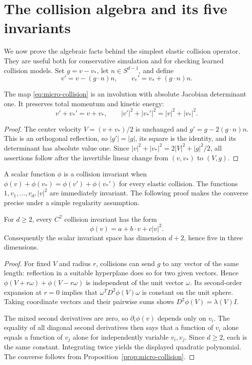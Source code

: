 \section{The collision algebra and its five invariants}

We now prove the algebraic facts behind the simplest elastic collision
operator.  They are useful both for conservative simulation and for
checking learned collision models.  Set $g=v-v_*$, let
$n\in S^{d-1}$, and define
\begin{equation}
 v'=v-(g\cdot n)n,\qquad
 v_*'=v_*+(g\cdot n)n.
 \label{eq:micro-collision}
\end{equation}

\begin{proposition}
\label{prop:micro-collision}
The map \eqref{eq:micro-collision} is an involution with absolute
Jacobian determinant one.  It preserves total momentum and kinetic
energy:
\[
 v'+v_*'=v+v_*,\qquad
 |v'|^2+|v_*'|^2=|v|^2+|v_*|^2.
\]
\end{proposition}
\begin{proof}
The center velocity $V=(v+v_*)/2$ is unchanged and
$g'=g-2(g\cdot n)n$.  This is an orthogonal reflection, so
$|g'|=|g|$, its square is the identity, and its determinant has
absolute value one.  Since
$|v|^2+|v_*|^2=2|V|^2+|g|^2/2$, all assertions follow after the
invertible linear change from $(v,v_*)$ to $(V,g)$.
\end{proof}

A scalar function $\phi$ is a collision invariant when
$\phi(v)+\phi(v_*)=\phi(v')+\phi(v_*')$ for every elastic
collision.  The functions $1,v_1,\ldots,v_d,|v|^2$ are immediately
invariant.  The following proof makes the converse precise under a
simple regularity assumption.

\begin{proposition}
\label{prop:micro-invariants}
For $d\ge2$, every $C^2$ collision invariant has the form
\[
 \phi(v)=a+b\cdot v+c|v|^2.
\]
Consequently the scalar invariant space has dimension $d+2$, hence
five in three dimensions.
\end{proposition}
\begin{proof}
For fixed $V$ and radius $r$, collisions can send $g$ to any vector
of the same length: reflection in a suitable hyperplane does so for
two given vectors.  Hence
$\phi(V+r\omega)+\phi(V-r\omega)$ is independent of the unit
vector $\omega$.  Its second-order expansion at $r=0$ implies
that $\omega^TD^2\phi(V)\omega$ is constant on the unit sphere.
Taking coordinate vectors and their pairwise sums shows
$D^2\phi(V)=\lambda(V)I$.

The mixed second derivatives are zero, so $\partial_i\phi(v)$
depends only on $v_i$.  The equality of all diagonal second
derivatives then says that a function of $v_i$ alone equals a function
of $v_j$ alone for independently variable $v_i,v_j$.  Since $d\ge2$,
each is the same constant.  Integrating twice yields the displayed
quadratic polynomial.  The converse follows from
Proposition~\ref{prop:micro-collision}.
\end{proof}

